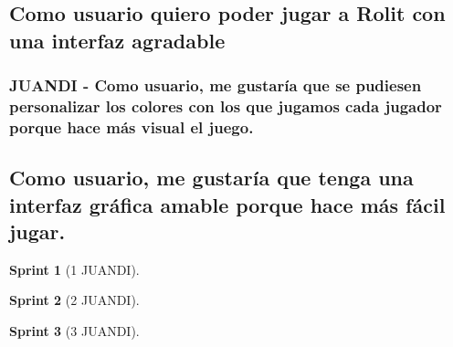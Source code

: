 \documentclass{article}
\theoremstyle{break}
\newtheorem*{sprint}{Sprint}
\begin{document}
\subsection{Como usuario quiero poder jugar a Rolit con una interfaz agradable}

\subsubsection{JUANDI - Como usuario, me gustaría que se pudiesen personalizar los colores con los que jugamos cada jugador porque hace más visual el juego.}

\subsection{Como usuario, me gustaría que tenga una interfaz gráfica amable porque hace más fácil jugar.}
\begin{sprint}[1 JUANDI]

\end{sprint}

\begin{sprint}[2 JUANDI]

\end{sprint}

\begin{sprint}[3 JUANDI]

\end{sprint}
\end{document}
